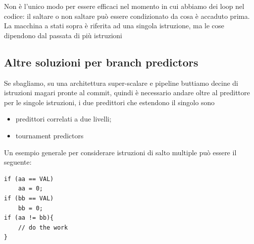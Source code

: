 \documentclass[14pt, oneside]{book}
\begin{document}
Non è l'unico modo per essere efficaci nel momento in cui abbiamo dei loop nel codice: il saltare o non saltare può essere condizionato da cosa è accaduto prima. La macchina a stati sopra è riferita ad una singola istruzione, ma le cose dipendono dal passata di più istruzioni
\subsection{Altre soluzioni per branch predictors}
Se sbagliamo, su una architettura super-scalare e pipeline buttiamo decine di istruzioni magari pronte al commit, quindi è necessario andare oltre al predittore per le singole istruzioni, i due predittori che estendono il singolo sono
\begin{itemize}
\item predittori correlati a due livelli;
\item tournament predictors
\end{itemize}
Un esempio generale per considerare istruzioni di salto multiple può essere il seguente:
\begin{lstlisting}
if (aa == VAL)
	aa = 0;
if (bb == VAL)
	bb = 0;
if (aa != bb){
	// do the work
}
\end{lstlisting}
\end{document}
